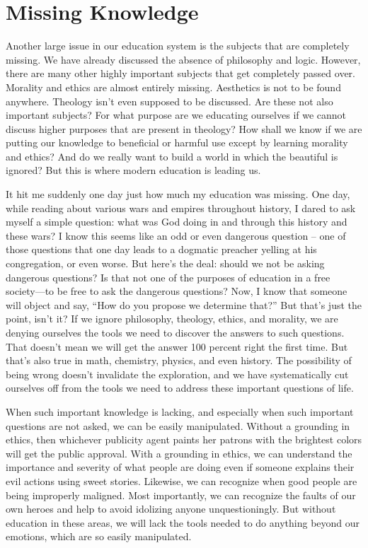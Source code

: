 \documentclass[letterpaper]{article}
\begin{document}
\section{Missing Knowledge}
{\color{black}
Another large issue in our education
\textcolor[rgb]{0.32941177,0.5529412,0.83137256}{system} is the
subjects that are completely missing. We have already discussed the
absence of philosophy and logic. However, there are many other highly
important subjects that get completely passed over. Morality and ethics
are almost entirely missing. Aesthetics is not to be found anywhere.
Theology isn’t even supposed to be discussed. Are these not also
important subjects?  For what purpose are we educating ourselves if we
cannot discuss higher purposes that are present in theology?  How shall
we know if we are putting our knowledge to beneficial or harmful use
except by learning morality and ethics?  And do we really want to build
a world in which the beautiful is ignored?  But this is where modern
education is leading us.}

{\color{black}
It hit me suddenly one day just how much my education was missing. One
day, while reading about various wars and empires throughout history, I
dared to ask myself a simple question: what was God doing in and
through this history and these wars?  I know this seems like an odd or
even dangerous question – one of those questions that one day leads to
a dogmatic preacher yelling at
\textcolor[rgb]{0.32941177,0.5529412,0.83137256}{his} congregation, or
even worse. But here’s the deal: should we not be asking dangerous
questions?  Is that not one of the purposes of education in a free
society—to be free to ask the dangerous questions?  Now, I know that
someone will object and say, “How do you propose we determine that?” 
But that’s just the point, isn’t it?  If we ignore philosophy,
theology, ethics, and morality, we are denying ourselves the tools we
need to discover the answers to such questions. That doesn’t mean we
will get the answer 100 percent right the first time. But that’s also
true in math, chemistry, physics, and even history. The possibility of
being wrong doesn’t invalidate the exploration, and we have
systematically cut ourselves off from the tools we need to address
these important questions of life. }

{\color{black}
When such important knowledge is lacking, and especially when such
important questions are not asked, we can be easily manipulated.
Without a grounding in ethics, then whichever publicity agent paints
\textcolor[rgb]{0.32941177,0.5529412,0.83137256}{her} patrons with the
brightest colors will get the public approval. With a grounding in
ethics, we can understand the importance and severity of what people
are doing even if someone explains their evil actions using sweet
stories. Likewise, we can recognize when good people are being
improperly maligned. Most importantly, we can recognize the faults of
our own heroes and help to avoid idolizing anyone unquestioningly. But
without education in these areas, we will lack the tools needed to do
anything beyond our emotions, which are so easily manipulated.}
\end{document}
